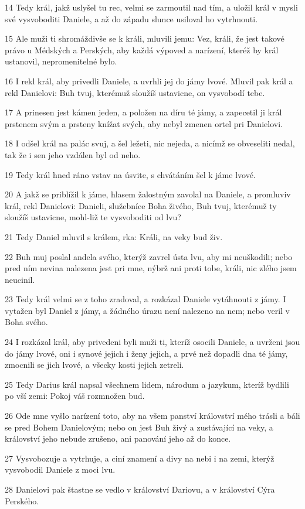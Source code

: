 \par 14 Tedy král, jakž uslyšel tu rec, velmi se zarmoutil nad tím, a uložil král v mysli své vysvoboditi Daniele, a až do západu slunce usiloval ho vytrhnouti.
\par 15 Ale muži ti shromáždivše se k králi, mluvili jemu: Vez, králi, že jest takové právo u Médských a Perských, aby každá výpoved a narízení, kteréž by král ustanovil, nepromenitelné bylo.
\par 16 I rekl král, aby privedli Daniele, a uvrhli jej do jámy lvové. Mluvil pak král a rekl Danielovi: Buh tvuj, kterémuž sloužíš ustavicne, on vysvobodí tebe.
\par 17 A prinesen jest kámen jeden, a položen na díru té jámy, a zapecetil ji král prstenem svým a prsteny knížat svých, aby nebyl zmenen ortel pri Danielovi.
\par 18 I odšel král na palác svuj, a šel ležeti, nic nejeda, a nicímž se obveseliti nedal, tak že i sen jeho vzdálen byl od neho.
\par 19 Tedy král hned ráno vstav na úsvite, s chvátáním šel k jáme lvové.
\par 20 A jakž se priblížil k jáme, hlasem žalostným zavolal na Daniele, a promluviv král, rekl Danielovi: Danieli, služebníce Boha živého, Buh tvuj, kterémuž ty sloužíš ustavicne, mohl-liž te vysvoboditi od lvu?
\par 21 Tedy Daniel mluvil s králem, rka: Králi, na veky bud živ.
\par 22 Buh muj poslal andela svého, kterýž zavrel ústa lvu, aby mi neuškodili; nebo pred ním nevina nalezena jest pri mne, nýbrž ani proti tobe, králi, nic zlého jsem neucinil.
\par 23 Tedy král velmi se z toho zradoval, a rozkázal Daniele vytáhnouti z jámy. I vytažen byl Daniel z jámy, a žádného úrazu není nalezeno na nem; nebo veril v Boha svého.
\par 24 I rozkázal král, aby privedeni byli muži ti, kteríž osocili Daniele, a uvrženi jsou do jámy lvové, oni i synové jejich i ženy jejich, a prvé než dopadli dna té jámy, zmocnili se jich lvové, a všecky kosti jejich zetreli.
\par 25 Tedy Darius král napsal všechnem lidem, národum a jazykum, kteríž bydlili po vší zemi: Pokoj váš rozmnožen bud.
\par 26 Ode mne vyšlo narízení toto, aby na všem panství království mého trásli a báli se pred Bohem Danielovým; nebo on jest Buh živý a zustávající na veky, a království jeho nebude zrušeno, ani panování jeho až do konce.
\par 27 Vysvobozuje a vytrhuje, a ciní znamení a divy na nebi i na zemi, kterýž vysvobodil Daniele z moci lvu.
\par 28 Danielovi pak štastne se vedlo v království Dariovu, a v království Cýra Perského.

